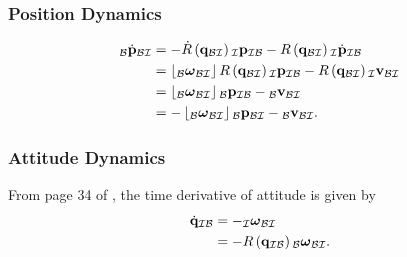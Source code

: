 \documentclass{beamer}
\begin{document}
\begin{frame}
\frametitle{Position Dynamics}
\begin{align}
_{\mathcal{B}}\dot{{\bf p}}_{\mathcal{B}\mathcal{I}} & =-\dot{R}\left({\bf q}_{\mathcal{B}\mathcal{I}}\right){}_{\mathcal{I}}{\bf p}_{\mathcal{I}\mathcal{B}}-R\left({\bf q}_{\mathcal{B}\mathcal{I}}\right){}_{\mathcal{I}}\dot{{\bf p}}_{\mathcal{I}\mathcal{B}}\\
 & =\left\lfloor _{\mathcal{B}}\boldsymbol{\omega}_{\mathcal{B}\mathcal{I}}\right\rfloor R\left({\bf q}_{\mathcal{B}\mathcal{I}}\right){}_{\mathcal{I}}{\bf p}_{\mathcal{I}\mathcal{B}}-R\left({\bf q}_{\mathcal{B}\mathcal{I}}\right){}_{\mathcal{I}}{\bf v}_{\mathcal{B}\mathcal{I}}\\
 & =\left\lfloor _{\mathcal{B}}\boldsymbol{\omega}_{\mathcal{B}\mathcal{I}}\right\rfloor {}_{\mathcal{B}}{\bf p}_{\mathcal{I}\mathcal{B}}-{}_{\mathcal{B}}{\bf v}_{\mathcal{B}\mathcal{I}}\\
 & =-\left\lfloor _{\mathcal{B}}\boldsymbol{\omega}_{\mathcal{B}\mathcal{I}}\right\rfloor {}_{\mathcal{B}}{\bf p}_{\mathcal{B}\mathcal{I}}-{}_{\mathcal{B}}{\bf v}_{\mathcal{B}\mathcal{I}}.
\end{align}
\end{frame}

\begin{frame}
\frametitle{Attitude Dynamics}
From page 34 of \cite{key-4}, the time derivative of attitude is
given by
\begin{align}
\dot{{\bf q}}_{\mathcal{I}\mathcal{B}} & =-_{\mathcal{I}}\boldsymbol{\omega}_{\mathcal{B}\mathcal{I}}\\
 & =-R\left({\bf q}_{\mathcal{I}\mathcal{B}}\right){}_{\mathcal{B}}\boldsymbol{\omega}_{\mathcal{B}\mathcal{I}}.
\end{align}
\end{frame}
\end{document}
